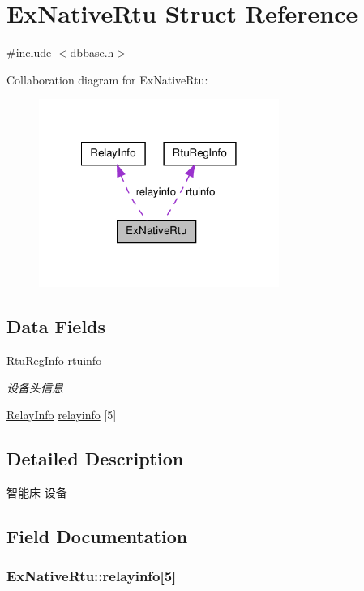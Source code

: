 \hypertarget{structExNativeRtu}{\section{Ex\-Native\-Rtu Struct Reference}
\label{structExNativeRtu}
}


{\ttfamily \#include $<$dbbase.\-h$>$}



Collaboration diagram for Ex\-Native\-Rtu\-:\nopagebreak
\begin{figure}[H]
\begin{center}
\leavevmode
\includegraphics[width=222pt]{structExNativeRtu__coll__graph}
\end{center}
\end{figure}
\subsection*{Data Fields}
\begin{DoxyCompactItemize}
\item 
\hyperlink{structRtuRegInfo}{Rtu\-Reg\-Info} \hyperlink{structExNativeRtu_a880cf200ec393f75b6a72b3a47b8af88}{rtuinfo}
\begin{DoxyCompactList}\small\item\em 设备头信息 \end{DoxyCompactList}\item 
\hyperlink{structRelayInfo}{Relay\-Info} \hyperlink{structExNativeRtu_a8bff0a97f7771458d2ab36a2854d7247}{relayinfo} \mbox{[}5\mbox{]}
\end{DoxyCompactItemize}


\subsection{Detailed Description}
智能床 设备 

\subsection{Field Documentation}
\hypertarget{structExNativeRtu_a8bff0a97f7771458d2ab36a2854d7247}{
\subsubsection[{relayinfo}]{ Ex\-Native\-Rtu\-::relayinfo\mbox{[}5\mbox{]}}}\label{structExNativeRtu_a8bff0a97f7771458d2ab36a2854d7247}


